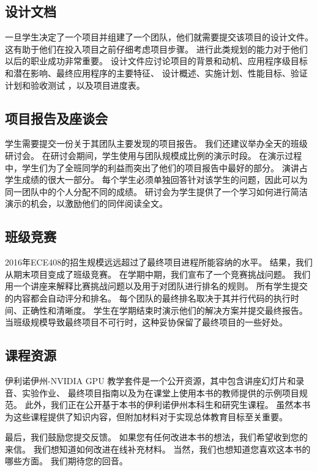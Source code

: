 \subsection{设计文档}
一旦学生决定了一个项目并组建了一个团队，他们就需要提交该项目的设计文件。 
这有助于他们在投入项目之前仔细考虑项目步骤。 进行此类规划的能力对于他们以后的职业成功非常重要。 
设计文件应讨论项目的背景和动机、应用程序级目标和潜在影响、最终应用程序的主要特征、
设计概述、实施计划、性能目标、验证计划和验收测试 ，以及项目进度表。

\subsection{项目报告及座谈会}
学生需要提交一份关于其团队主要发现的项目报告。 我们还建议举办全天的班级研讨会。 
在研讨会期间，学生使用与团队规模成比例的演示时段。 
在演示过程中，学生们为了全班同学的利益而突出了他们的项目报告中最好的部分。 
演讲占学生成绩的很大一部分。 每个学生必须单独回答针对该学生的问题，因此可以为同一团队中的个人分配不同的成绩。 
研讨会为学生提供了一个学习如何进行简洁演示的机会，以激励他们的同伴阅读全文。

\subsection{班级竞赛}
2016年ECE408的招生规模远远超过了最终项目进程所能容纳的水平。 结果，我们从期末项目变成了班级竞赛。 
在学期中期，我们宣布了一个竞赛挑战问题。 我们用一个讲座来解释比赛挑战问题以及用于对团队进行排名的规则。 
所有学生提交的内容都会自动评分和排名。 每个团队的最终排名取决于其并行代码的执行时间、正确性和清晰度。 
学生在学期结束时演示他们的解决方案并提交最终报告。 当班级规模导致最终项目不可行时，这种妥协保留了最终项目的一些好处。

\subsection{课程资源}
伊利诺伊州-NVIDIA GPU 教学套件是一个公开资源，其中包含讲座幻灯片和录音、实验作业、
最终项目指南以及为在课堂上使用本书的教师提供的示例项目规范。 此外，我们正在公开基于本书的伊利诺伊州本科生和研究生课程。 
虽然本书为这些课程提供了知识内容，但附加材料对于实现总体教育目标至关重要。

最后，我们鼓励您提交反馈。 如果您有任何改进本书的想法，我们希望收到您的来信。 我们想知道如何改进在线补充材料。 
当然，我们也想知道您喜欢这本书的哪些方面。 我们期待您的回音。
